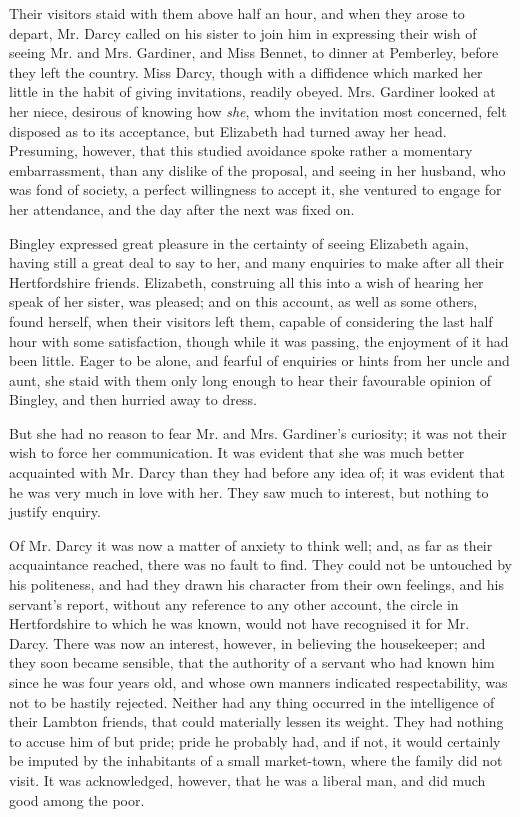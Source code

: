 Their visitors staid with them above half an hour, and
when they arose to depart, Mr. Darcy called on his sister
to join him in expressing their wish of seeing Mr. and
Mrs. Gardiner, and Miss Bennet, to dinner at Pemberley,
before they left the country. Miss Darcy, though with
a diffidence which marked her little in the habit of giving
invitations, readily obeyed. Mrs. Gardiner looked at her
niece, desirous of knowing how \textit{she}, whom the invitation
most concerned, felt disposed as to its acceptance, but
Elizabeth had turned away her head. Presuming,
however, that this studied avoidance spoke rather a momentary
embarrassment, than any dislike of the proposal, and
seeing in her husband, who was fond of society, a perfect
willingness to accept it, she ventured to engage for her
attendance, and the day after the next was fixed on.

Bingley expressed great pleasure in the certainty of
seeing Elizabeth again, having still a great deal to say
to her, and many enquiries to make after all their Hertfordshire
friends. Elizabeth, construing all this into a wish
of hearing her speak of her sister, was pleased; and on
this account, as well as some others, found herself, when
their visitors left them, capable of considering the last
half hour with some satisfaction, though while it was
passing, the enjoyment of it had been little. Eager to
be alone, and fearful of enquiries or hints from her uncle
and aunt, she staid with them only long enough to hear
their favourable opinion of Bingley, and then hurried
away to dress.

But she had no reason to fear Mr. and Mrs. Gardiner’s
curiosity; it was not their wish to force her communication.
It was evident that she was much better acquainted
with Mr. Darcy than they had before any idea
of; it was evident that he was very much in love with
her. They saw much to interest, but nothing to justify
enquiry.

Of Mr. Darcy it was now a matter of anxiety to think
well; and, as far as their acquaintance reached, there was
no fault to find. They could not be untouched by his
politeness, and had they drawn his character from their
own feelings, and his servant’s report, without any reference
to any other account, the circle in Hertfordshire to
which he was known, would not have recognised it for
Mr. Darcy. There was now an interest, however, in
believing the housekeeper; and they soon became sensible,
that the authority of a servant who had known him since
he was four years old, and whose own manners indicated
respectability, was not to be hastily rejected. Neither
had any thing occurred in the intelligence of their Lambton
friends, that could materially lessen its weight. They had
nothing to accuse him of but pride; pride he probably
had, and if not, it would certainly be imputed by the
inhabitants of a small market-town, where the family
did not visit. It was acknowledged, however, that he
was a liberal man, and did much good among the poor.

